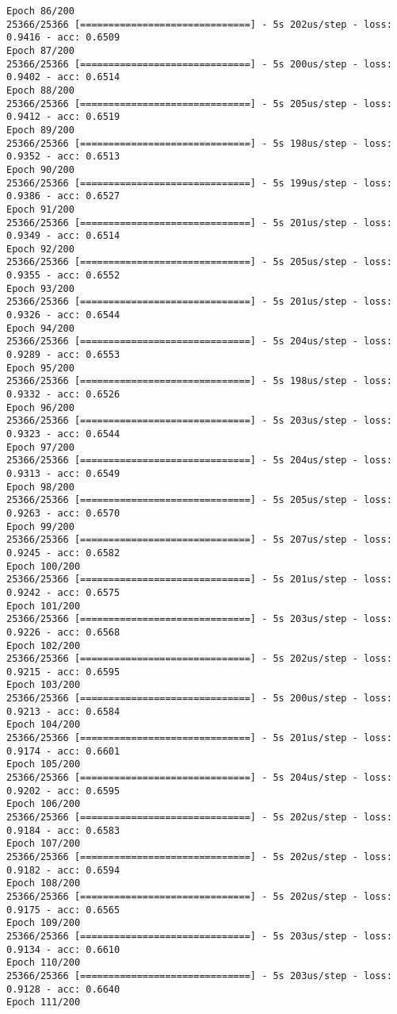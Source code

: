 \documentclass[11pt]{article}
\begin{document}
\begin{Verbatim}[commandchars=\\\{\}]
Epoch 86/200
25366/25366 [==============================] - 5s 202us/step - loss: 0.9416 - acc: 0.6509
Epoch 87/200
25366/25366 [==============================] - 5s 200us/step - loss: 0.9402 - acc: 0.6514
Epoch 88/200
25366/25366 [==============================] - 5s 205us/step - loss: 0.9412 - acc: 0.6519
Epoch 89/200
25366/25366 [==============================] - 5s 198us/step - loss: 0.9352 - acc: 0.6513
Epoch 90/200
25366/25366 [==============================] - 5s 199us/step - loss: 0.9386 - acc: 0.6527
Epoch 91/200
25366/25366 [==============================] - 5s 201us/step - loss: 0.9349 - acc: 0.6514
Epoch 92/200
25366/25366 [==============================] - 5s 205us/step - loss: 0.9355 - acc: 0.6552
Epoch 93/200
25366/25366 [==============================] - 5s 201us/step - loss: 0.9326 - acc: 0.6544
Epoch 94/200
25366/25366 [==============================] - 5s 204us/step - loss: 0.9289 - acc: 0.6553
Epoch 95/200
25366/25366 [==============================] - 5s 198us/step - loss: 0.9332 - acc: 0.6526
Epoch 96/200
25366/25366 [==============================] - 5s 203us/step - loss: 0.9323 - acc: 0.6544
Epoch 97/200
25366/25366 [==============================] - 5s 204us/step - loss: 0.9313 - acc: 0.6549
Epoch 98/200
25366/25366 [==============================] - 5s 205us/step - loss: 0.9263 - acc: 0.6570
Epoch 99/200
25366/25366 [==============================] - 5s 207us/step - loss: 0.9245 - acc: 0.6582
Epoch 100/200
25366/25366 [==============================] - 5s 201us/step - loss: 0.9242 - acc: 0.6575
Epoch 101/200
25366/25366 [==============================] - 5s 203us/step - loss: 0.9226 - acc: 0.6568
Epoch 102/200
25366/25366 [==============================] - 5s 202us/step - loss: 0.9215 - acc: 0.6595
Epoch 103/200
25366/25366 [==============================] - 5s 200us/step - loss: 0.9213 - acc: 0.6584
Epoch 104/200
25366/25366 [==============================] - 5s 201us/step - loss: 0.9174 - acc: 0.6601
Epoch 105/200
25366/25366 [==============================] - 5s 204us/step - loss: 0.9202 - acc: 0.6595
Epoch 106/200
25366/25366 [==============================] - 5s 202us/step - loss: 0.9184 - acc: 0.6583
Epoch 107/200
25366/25366 [==============================] - 5s 202us/step - loss: 0.9182 - acc: 0.6594
Epoch 108/200
25366/25366 [==============================] - 5s 202us/step - loss: 0.9175 - acc: 0.6565
Epoch 109/200
25366/25366 [==============================] - 5s 203us/step - loss: 0.9134 - acc: 0.6610
Epoch 110/200
25366/25366 [==============================] - 5s 203us/step - loss: 0.9128 - acc: 0.6640
Epoch 111/200

\end{Verbatim}
\end{document}
